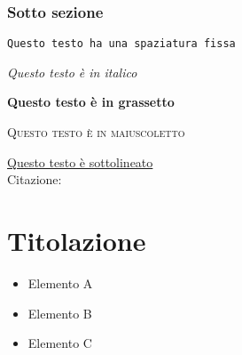 \documentclass[twoside]{supsistudent}
\begin{document}
\subsection{Sotto sezione}

\texttt{Questo testo ha una spaziatura fissa}

\textit{Questo testo \`e in italico}

\textbf{Questo testo \`e in grassetto}

\textsc{Questo testo \`e in maiuscoletto}

\underline{Questo testo \`e sottolineato} \\

Citazione:
\begin{quote}
\lipsum[23]
\end{quote}

\chapter{Titolazione}

\lipsum[13]

\begin{itemize}
  \item Elemento A
  \item Elemento B
  \item Elemento C
\end{itemize}

%

\lipsum[23]
%
%
%
%
%
%
%
%
%
%



\end{document}
